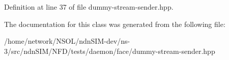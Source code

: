 Definition at line 37 of file dummy-\/stream-\/sender.\+hpp.



The documentation for this class was generated from the following file\+:\begin{DoxyCompactItemize}
\item 
/home/network/\+N\+S\+O\+L/ndn\+S\+I\+M-\/dev/ns-\/3/src/ndn\+S\+I\+M/\+N\+F\+D/tests/daemon/face/dummy-\/stream-\/sender.\+hpp\end{DoxyCompactItemize}
